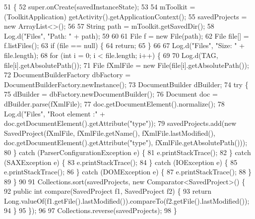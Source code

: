 \begin{DoxyCode}
51                                                     \{
52         super.onCreate(savedInstanceState);
53 
54         mToolkit = (ToolkitApplication) getActivity().getApplicationContext();
55         savedProjects = \textcolor{keyword}{new} ArrayList<>();
56 
57         String path = mToolkit.getSavedDir();
58         Log.d(\textcolor{stringliteral}{"Files"}, \textcolor{stringliteral}{"Path: "} + path);
59 
60 
61         File f = \textcolor{keyword}{new} File(path);
62         File file[] = f.listFiles();
63         \textcolor{keywordflow}{if} (file == null) \{
64             \textcolor{keywordflow}{return};
65         \}
66 
67         Log.d(\textcolor{stringliteral}{"Files"}, \textcolor{stringliteral}{"Size: "} + file.length);
68         \textcolor{keywordflow}{for} (\textcolor{keywordtype}{int} i = 0; i < file.length; i++) \{
69 
70             Log.d(TAG, file[i].getAbsolutePath());
71             File fXmlFile = \textcolor{keyword}{new} File(file[i].getAbsolutePath());
72             DocumentBuilderFactory dbFactory = DocumentBuilderFactory.newInstance();
73             DocumentBuilder dBuilder;
74             \textcolor{keywordflow}{try} \{
75                 dBuilder = dbFactory.newDocumentBuilder();
76                 Document doc = dBuilder.parse(fXmlFile);
77                 doc.getDocumentElement().normalize();
78                 Log.d(\textcolor{stringliteral}{"Files"}, \textcolor{stringliteral}{"Root element :"} + doc.getDocumentElement().getAttribute(\textcolor{stringliteral}{"type"}));
79                 savedProjects.add(\textcolor{keyword}{new} SavedProject(fXmlFile, fXmlFile.getName(), fXmlFile.lastModified(), 
      doc.getDocumentElement().getAttribute(\textcolor{stringliteral}{"type"}), fXmlFile.getAbsolutePath()));
80             \} \textcolor{keywordflow}{catch} (ParserConfigurationException e) \{
81                 e.printStackTrace();
82             \} \textcolor{keywordflow}{catch} (SAXException e) \{
83                 e.printStackTrace();
84             \} \textcolor{keywordflow}{catch} (IOException e) \{
85                 e.printStackTrace();
86             \} \textcolor{keywordflow}{catch} (DOMException e) \{
87                 e.printStackTrace();
88             \}
89         \}
90 
91         Collections.sort(savedProjects, \textcolor{keyword}{new} Comparator<SavedProject>() \{
92             \textcolor{keyword}{public} \textcolor{keywordtype}{int} compare(SavedProject f1, SavedProject f2) \{
93                 \textcolor{keywordflow}{return} Long.valueOf(f1.getFile().lastModified()).compareTo(f2.getFile().lastModified());
94             \}
95         \});
96 
97         Collections.reverse(savedProjects);
98     \}
\end{DoxyCode}
